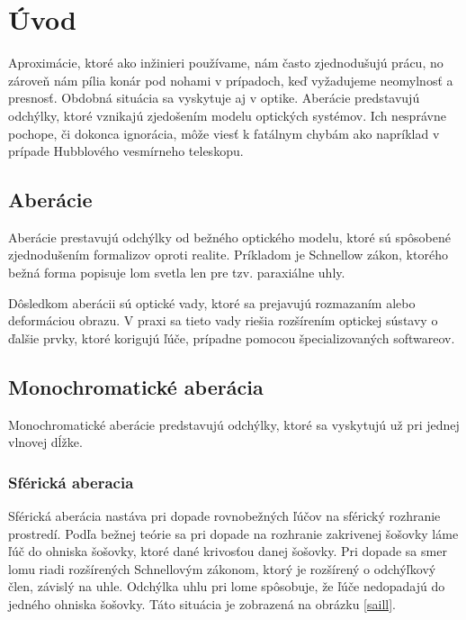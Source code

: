 \chapter{Úvod}
Aproximácie, ktoré ako inžinieri používame, nám často zjednodušujú prácu, no zároveň nám pília konár
pod nohami v prípadoch, keď vyžadujeme neomylnosť a presnosť.
Obdobná situácia sa vyskytuje aj v optike. Aberácie predstavujú odchýlky, ktoré vznikajú zjedošením
modelu optických systémov. Ich nesprávne pochope, či dokonca ignorácia, môže viesť k fatálnym chybám
ako napríklad v prípade Hubblového vesmírneho teleskopu.

\section{Aberácie}
Aberácie prestavujú odchýlky od bežného optického modelu, ktoré sú spôsobené zjednodušením
formalizov oproti realite. Príkladom je Schnellow zákon, ktorého bežná forma popisuje lom svetla len
pre tzv. paraxiálne uhly. \cite{hechtoptics}

Dôsledkom aberácii sú optické vady, ktoré sa prejavujú rozmazaním alebo deformáciou obrazu. V praxi sa tieto
vady riešia rozšírením optickej sústavy o ďalšie prvky, ktoré korigujú ľúče, prípadne pomocou
špecializovaných softwareov.

\section{Monochromatické aberácia}
Monochromatické aberácie predstavujú odchýlky, ktoré sa vyskytujú už pri jednej vlnovej dĺžke.
\subsection{Sférická aberacia}
Sférická aberácia nastáva pri dopade rovnobežných ľúčov na sférický rozhranie prostredí. 
Podľa bežnej teórie sa pri dopade na rozhranie zakrivenej šošovky láme ľúč do ohniska šošovky, ktoré
dané krivosťou danej šošovky. 
Pri dopade sa smer lomu riadi rozšírených Schnellovým zákonom, ktorý je rozšírený o odchýľkový člen, závislý na
uhle. Odchýlka uhlu pri lome spôsobuje, že ľúče nedopadajú do jedného ohniska šošovky. Táto situácia
je zobrazená na obrázku \ref{saill}.

